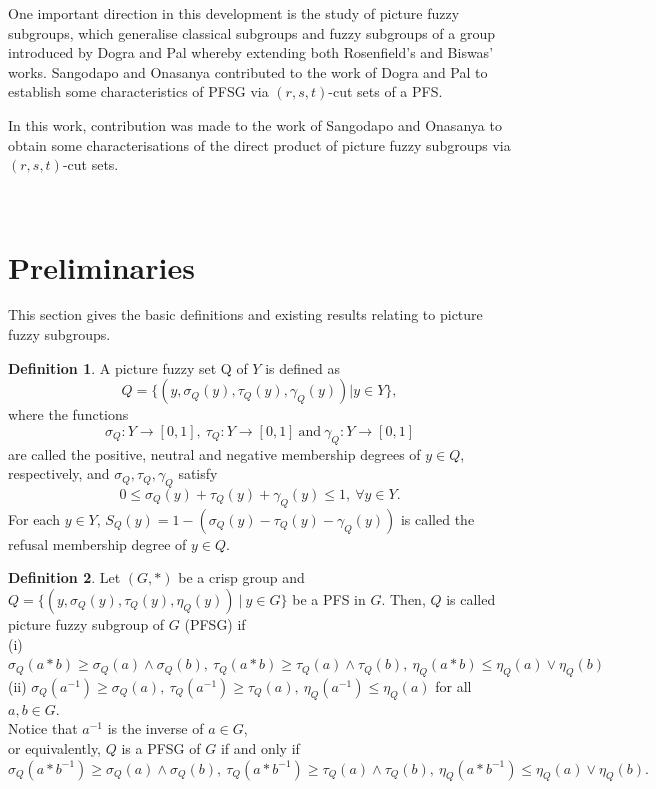 \documentclass[12pt,letterpaper]{amsart}
\theoremstyle{plain}
\theoremstyle{definition}
\newtheorem{definition}{Definition}[section]
\numberwithin{equation}{section}
\begin{document}
One important direction in this development is the study of picture fuzzy subgroups, which generalise classical subgroups and fuzzy subgroups of a group introduced by Dogra and Pal \cite{dp} whereby extending both Rosenfield's and Biswas' works. Sangodapo and Onasanya \cite{so} contributed to the work of Dogra and Pal \cite{dp} to establish some characteristics of PFSG via $(r, s, t)$-cut sets of a PFS.

In this work, contribution was made to the work of Sangodapo and Onasanya \cite{so} to obtain some characterisations of the direct product of picture fuzzy subgroups via $(r, s, t)$-cut sets.  


\ \\

\section{Preliminaries}
This section gives the basic definitions and existing results relating to picture fuzzy subgroups.

\begin{definition} \cite{ck}
A picture fuzzy set Q of $Y$ is defined as $$Q = \lbrace (y, \sigma_{Q}(y), \tau_{Q}(y), \gamma_{Q}(y))| y \in Y \rbrace,$$ where the functions $$\sigma_{Q}: Y \rightarrow [0, 1],~ \tau_{Q}: Y \rightarrow [0, 1]~ \text{and}~ \gamma_{Q}: Y \rightarrow [0, 1]$$
are called the positive, neutral and negative membership degrees of $y \in Q$, respectively, and $\sigma_{Q}, \tau_{Q}, \gamma_{Q}$ satisfy $$0 \leq \sigma_{Q}(y) + \tau_{Q}(y) + \gamma_{Q}(y) \leq 1,~ \forall y \in Y.$$ For each $y \in Y$, $S_{Q}(y) = 1 - (\sigma_{Q}(y) - \tau_{Q}(y) - \gamma_{Q}(y))$ is called the refusal membership degree of $y \in Q$.
\end{definition}

\begin{definition}\cite{dp}
Let $(G, \ast)$ be a crisp group and $Q = \lbrace (y, \sigma_{Q}(y), \tau_Q(y), \eta_Q(y))~|~ y \in G \rbrace$ be a PFS in $G$. Then, $Q$ is called picture fuzzy subgroup of $G$ (PFSG) if\\ (i)~ $\sigma_Q(a \ast b) \geq \sigma_Q(a) \wedge \sigma_Q(b),~ \tau_Q(a \ast b) \geq \tau_Q(a) \wedge \tau_Q(b),~ \eta_Q(a \ast b) \leq \eta_Q(a) \vee \eta_Q(b) $\\ (ii) $\sigma_Q(a^{-1}) \geq \sigma_Q(a),~ \tau_Q(a^{-1}) \geq \tau_Q(a),~ \eta_Q(a^{-1}) \leq \eta_Q(a)$ for all $a, b \in G$.\\ Notice that $a^{-1}$ is the inverse of $a \in G$,\\ or equivalently, $Q$ is a PFSG of $G$ if and only if\\ $\sigma_Q(a \ast b^{-1}) \geq \sigma_Q(a) \wedge \sigma_Q(b),~ \tau_Q(a \ast b^{-1}) \geq \tau_Q(a) \wedge \tau_Q(b),~ \eta_Q(a \ast b^{-1}) \leq \eta_Q(a) \vee \eta_Q(b) .$
\end{definition}
\end{document}
